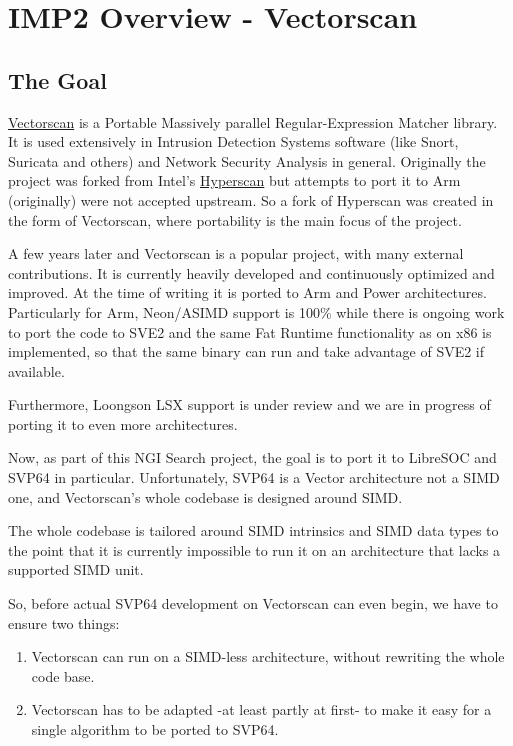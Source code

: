 \section{IMP2 Overview - Vectorscan}

\subsection{The Goal}

\href{https://github.com/VectorCamp/vectorscan}{Vectorscan} is a Portable Massively parallel Regular-Expression Matcher library. It is used extensively in Intrusion Detection Systems software (like Snort, Suricata and others) and Network Security Analysis in general.
Originally the project was forked from Intel's \href{https://github.com/intel/hyperscan}{Hyperscan} but attempts to port it to Arm (originally) were not accepted upstream. So a fork of Hyperscan was created in the form of Vectorscan, where portability is the main focus of the project.

A few years later and Vectorscan is a popular project, with many external contributions. It is currently heavily developed and continuously optimized and improved. 
At the time of writing it is ported to Arm and Power architectures. Particularly for Arm, Neon/ASIMD support is 100\% while there is ongoing work to port the code to SVE2 and the same Fat Runtime functionality as on x86 is implemented, so that the same binary can run and take advantage of SVE2 if available. 

Furthermore, Loongson LSX support is under review and we are in progress of porting it to even more architectures. 

Now, as part of this NGI Search project, the goal is to port it to LibreSOC and SVP64 in particular. Unfortunately, SVP64 is a Vector architecture not a SIMD one, and Vectorscan's whole codebase is designed around SIMD.

The whole codebase is tailored around SIMD intrinsics and SIMD data types to the point that it is currently impossible to run it on an architecture that lacks a supported SIMD unit.

So, before actual SVP64 development on Vectorscan can even begin, we have to ensure two things:

\begin{enumerate}
  \item Vectorscan can run on a SIMD-less architecture, without rewriting the whole code base.
  \item Vectorscan has to be adapted -at least partly at first- to make it easy for a single algorithm to be ported to SVP64.
\end{enumerate}

